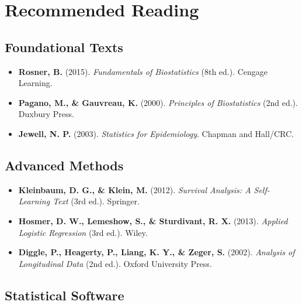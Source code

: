 \documentclass[
  11pt,
  letterpaper,
  oneside]{book}
\providecommand{\tightlist}{%
  \setlength{\itemsep}{0pt}\setlength{\parskip}{0pt}}\usepackage{longtable,booktabs,array}
\begin{document}
\section*{Recommended Reading}\label{recommended-reading}


\subsection*{Foundational Texts}\label{foundational-texts}

\begin{itemize}
\tightlist
\item
  \textbf{Rosner, B.} (2015). \emph{Fundamentals of Biostatistics} (8th
  ed.). Cengage Learning.
\item
  \textbf{Pagano, M., \& Gauvreau, K.} (2000). \emph{Principles of
  Biostatistics} (2nd ed.). Duxbury Press.
\item
  \textbf{Jewell, N. P.} (2003). \emph{Statistics for Epidemiology}.
  Chapman and Hall/CRC.
\end{itemize}

\subsection*{Advanced Methods}\label{advanced-methods}

\begin{itemize}
\tightlist
\item
  \textbf{Kleinbaum, D. G., \& Klein, M.} (2012). \emph{Survival
  Analysis: A Self-Learning Text} (3rd ed.). Springer.
\item
  \textbf{Hosmer, D. W., Lemeshow, S., \& Sturdivant, R. X.} (2013).
  \emph{Applied Logistic Regression} (3rd ed.). Wiley.
\item
  \textbf{Diggle, P., Heagerty, P., Liang, K. Y., \& Zeger, S.} (2002).
  \emph{Analysis of Longitudinal Data} (2nd ed.). Oxford University
  Press.
\end{itemize}

\subsection*{Statistical Software}\label{statistical-software}
\end{document}
